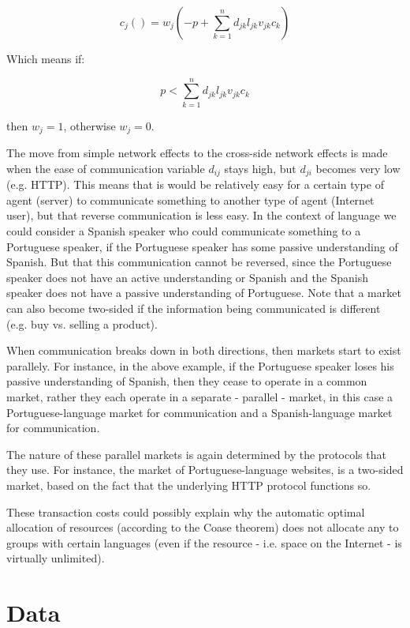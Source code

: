 \documentclass[a4paper,british]{article}\usepackage[]{graphicx}\usepackage[]{xcolor}
\begin{document}
\begin{equation}
c_{j}()=w_{j}(-p+\sum_{k=1}^{n}d_{jk}l_{jk}v_{jk}c_{k})
\end{equation}

Which means if:

\begin{equation}
p<\sum_{k=1}^{n}d_{jk}l_{jk}v_{jk}c_{k}
\end{equation}

then $w_{j}=1$, otherwise $w_{j}=0$.

The move from simple network effects to the cross-side network effects
is made when the ease of communication variable $d_{ij}$ stays high,
but $d_{ji}$ becomes very low (e.g. HTTP). This means that is would
be relatively easy for a certain type of agent (server) to communicate
something to another type of agent (Internet user), but that reverse
communication is less easy. In the context of language we could consider
a Spanish speaker who could communicate something to a Portuguese
speaker, if the Portuguese speaker has some passive understanding
of Spanish. But that this communication cannot be reversed, since
the Portuguese speaker does not have an active understanding or Spanish
and the Spanish speaker does not have a passive understanding of Portuguese.
Note that a market can also become two-sided if the information being
communicated is different (e.g. buy vs. selling a product).

When communication breaks down in both directions, then markets start
to exist parallely. For instance, in the above example, if the Portuguese
speaker loses his passive understanding of Spanish, then they cease
to operate in a common market, rather they each operate in a separate
- parallel - market, in this case a Portuguese-language market for
communication and a Spanish-language market for communication.

The nature of these parallel markets is again determined by the protocols
that they use. For instance, the market of Portuguese-language websites,
is a two-sided market, based on the fact that the underlying HTTP
protocol functions so.

These transaction costs could possibly explain why the automatic optimal
allocation of resources (according to the Coase theorem) does not
allocate any to groups with certain languages (even if the resource
- i.e. space on the Internet - is virtually unlimited).

\section{Data}
\end{document}
